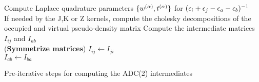 \begin{algorithm}
Compute Laplace quadrature parameters $\{w^{(\alpha)},t^{(\alpha)}\}$ for $(\epsilon_i + \epsilon_j - \epsilon_a - \epsilon_b)^{-1}$
\\
If needed by the J,K or Z kernels, compute the cholesky decompositions of the occupied and virtual pseudo-density matrix 
Compute the intermediate matrices $I_{ij}$ and $I_{ab}$
\\
\Substep(\textbf{Symmetrize matrices}){
$I_{ij} \leftarrow I_{ji}$
\\ 
$I_{ab} \leftarrow I_{ba}$
}
\caption{Pre-iterative steps for computing the ADC(2) intermediates}
\label{AODFSOSADC2INTERMEDIATES}
\end{algorithm}
%
